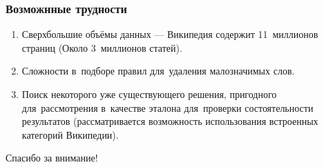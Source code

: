 \documentclass{beamer}
\begin{document}
\begin{frame}
\frametitle{Возможнные трудности}
\begin{enumerate}
\item {
Сверхбольшие объёмы данных --- Википедия содержит 11~миллионов страниц (Около 3~миллионов статей).
}
\item {
Сложности в~подборе правил для~удаления малозначимых слов.
}
\item {
Поиск некоторого уже существующего решения,
пригодного для~рассмотрения в~качестве эталона для~проверки состоятельности результатов 
(рассматривается возможность использования встроенных категорий Википедии). 
}
\end{enumerate}
\end{frame}

\begin{frame}
{\Large Спасибо за внимание!}
\end{frame}
\end{document}
